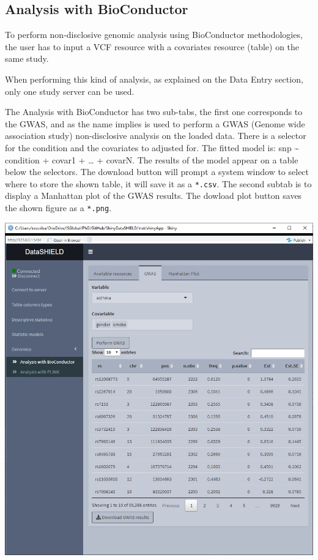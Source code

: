 \documentclass[
]{book}
\begin{document}
\hypertarget{analysis-with-bioconductor}{%
\subsection{Analysis with BioConductor}\label{analysis-with-bioconductor}}

To perform non-disclosive genomic analysis using BioConductor methodologies, the user has to input a VCF resource with a covariates resource (table) on the same study.

When performing this kind of analysis, as explained on the Data Entry section, only one study server can be used.

The Analysis with BioConductor has two sub-tabs, the first one corresponds to the GWAS, and as the name implies is used to perform a GWAS (Genome wide association study) non-disclosive analysis on the loaded data. There is a selector for the condition and the covariates to adjusted for. The fitted model is: snp \textasciitilde{} condition + covar1 + \ldots{} + covarN. The results of the model appear on a table below the selectors. The download button will prompt a system window to select where to store the shown table, it will save it as a \texttt{*.csv}. The second subtab is to display a Manhattan plot of the GWAS results. The dowload plot button saves the shown figure as a \texttt{*.png}.

\includegraphics{images/genomics1.png}
\end{document}
